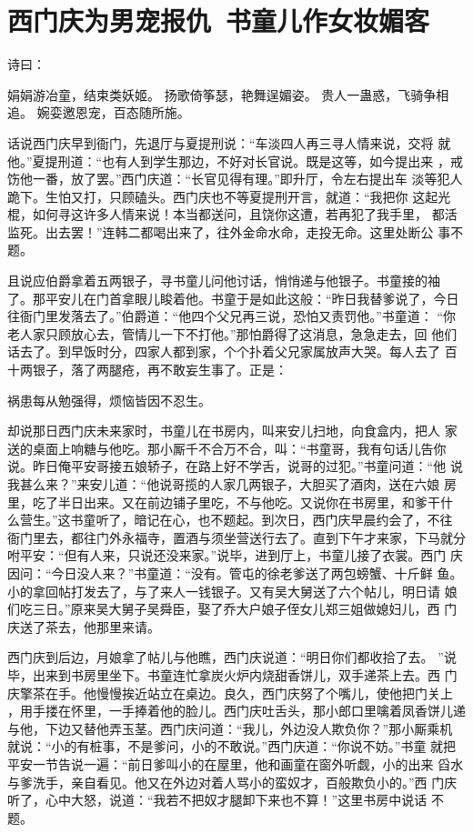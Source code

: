 \chapter{西门庆为男宠报仇~书童儿作女妆媚客}

诗曰：

娟娟游冶童，结束类妖姬。
扬歌倚筝瑟，艳舞逞媚姿。
贵人一蛊惑，飞骑争相追。
婉娈邀恩宠，百态随所施。

话说西门庆早到衙门，先退厅与夏提刑说：“车淡四人再三寻人情来说，交将
就他。”夏提刑道：“也有人到学生那边，不好对长官说。既是这等，如今提出来
，戒饬他一番，放了罢。”西门庆道：“长官见得有理。”即升厅，令左右提出车
淡等犯人跪下。生怕又打，只顾磕头。西门庆也不等夏提刑开言，就道：“我把你
这起光棍，如何寻这许多人情来说！本当都送问，且饶你这遭，若再犯了我手里，
都活监死。出去罢！”连韩二都喝出来了，往外金命水命，走投无命。这里处断公
事不题。

且说应伯爵拿着五两银子，寻书童儿问他讨话，悄悄递与他银子。书童接的袖
了。那平安儿在门首拿眼儿睃着他。书童于是如此这般：“昨日我替爹说了，今日
往衙门里发落去了。”伯爵道：“他四个父兄再三说，恐怕又责罚他。”书童道：
“你老人家只顾放心去，管情儿一下不打他。”那怕爵得了这消息，急急走去，回
他们话去了。到早饭时分，四家人都到家，个个扑着父兄家属放声大哭。每人去了
百十两银子，落了两腿疮，再不敢妄生事了。正是：

祸患每从勉强得，烦恼皆因不忍生。

却说那日西门庆未来家时，书童儿在书房内，叫来安儿扫地，向食盒内，把人
家送的桌面上响糖与他吃。那小厮千不合万不合，叫：“书童哥，我有句话儿告你
说。昨日俺平安哥接五娘轿子，在路上好不学舌，说哥的过犯。”书童问道：“他
说我甚么来？”来安儿道：“他说哥揽的人家几两银子，大胆买了酒肉，送在六娘
房里，吃了半日出来。又在前边铺子里吃，不与他吃。又说你在书房里，和爹干什
么营生。”这书童听了，暗记在心，也不题起。到次日，西门庆早晨约会了，不往
衙门里去，都往门外永福寺，置酒与须坐营送行去了。直到下午才来家，下马就分
咐平安：“但有人来，只说还没来家。”说毕，进到厅上，书童儿接了衣裳。西门
庆因问：“今日没人来？”书童道：“没有。管屯的徐老爹送了两包螃蟹、十斤鲜
鱼。小的拿回帖打发去了，与了来人一钱银子。又有吴大舅送了六个帖儿，明日请
娘们吃三日。”原来吴大舅子吴舜臣，娶了乔大户娘子侄女儿郑三姐做媳妇儿，西
门庆送了茶去，他那里来请。

西门庆到后边，月娘拿了帖儿与他瞧，西门庆说道：“明日你们都收拾了去。
”说毕，出来到书房里坐下。书童连忙拿炭火炉内烧甜香饼儿，双手递茶上去。西
门庆擎茶在手。他慢慢挨近站立在桌边。良久，西门庆努了个嘴儿，使他把门关上
，用手搂在怀里，一手捧着他的脸儿。西门庆吐舌头，那小郎口里噙着凤香饼儿递
与他，下边又替他弄玉茎。西门庆问道：“我儿，外边没人欺负你？”那小厮乘机
就说：“小的有桩事，不是爹问，小的不敢说。”西门庆道：“你说不妨。”书童
就把平安一节告说一遍：“前日爹叫小的在屋里，他和画童在窗外听觑，小的出来
舀水与爹洗手，亲自看见。他又在外边对着人骂小的蛮奴才，百般欺负小的。”西
门庆听了，心中大怒，说道：“我若不把奴才腿卸下来也不算！”这里书房中说话
不题。

